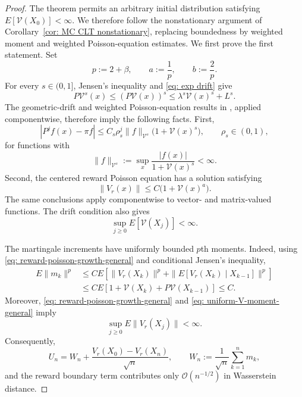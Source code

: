 \documentclass[11pt]{article}
\newcommand{\ve}{\mathscr{V}}
\begin{document}
\begin{proof}
The theorem permits an arbitrary initial distribution satisfying
$E[\ve(X_0)]<\infty$. We therefore follow the nonstationary argument of
Corollary~\ref{cor: MC CLT nonstationary}, replacing boundedness by weighted
moment and weighted Poisson-equation estimates. We first prove the first
statement. Set
\[
    p:=2+\beta,
    \qquad
    a:=\frac1p,
    \qquad
    b:=\frac2p.
\]
For every $s\in(0,1]$, Jensen's inequality and
\eqref{eq: exp drift} give
\[
    P\ve^s(x)
    \leq
    (P\ve(x))^s
    \leq
    \lambda^s\ve(x)^s+L^s.
\]
The geometric-drift and weighted Poisson-equation results in
\cite[Chapters~16--17]{meyn2012markov}, applied componentwise, therefore
imply the following facts. First,
\begin{equation}\label{eq: weighted-geometric-general}
    |P^j f(x)-\pi f|
    \leq
    C_s\rho_s^j\|f\|_{\ve^s}
    \bigl(1+\ve(x)^s\bigr),
    \qquad
    \rho_s\in(0,1),
\end{equation}
for functions with
\[
    \|f\|_{\ve^s}
    :=
    \sup_x\frac{|f(x)|}{1+\ve(x)^s}<\infty.
\]
Second, the centered reward Poisson equation has a solution satisfying
\begin{equation}\label{eq: reward-poisson-growth-general}
    \|V_r(x)\|
    \leq
    C\bigl(1+\ve(x)^a\bigr).
\end{equation}
The same conclusions apply componentwise to vector- and matrix-valued
functions. The drift condition also gives
\begin{equation}\label{eq: uniform-V-moment-general}
    \sup_{j\geq0}E[\ve(X_j)]<\infty.
\end{equation}

The martingale increments have uniformly bounded $p$th moments. Indeed,
using \eqref{eq: reward-poisson-growth-general} and conditional Jensen's
inequality,
\begin{align*}
E\|m_k\|^p
&\leq
C E\left[
    \|V_r(X_k)\|^p
    +
    \|E[V_r(X_k)\mid X_{k-1}]\|^p
\right]\\
&\leq
C E\left[1+\ve(X_k)+P\ve(X_{k-1})\right]
\leq C.
\end{align*}
Moreover, \eqref{eq: reward-poisson-growth-general} and
\eqref{eq: uniform-V-moment-general} imply
\[
    \sup_{j\geq0}E\|V_r(X_j)\|<\infty.
\]
Consequently,
\[
    U_n
    =
    W_n+
    \frac{V_r(X_0)-V_r(X_n)}{\sqrt n},
    \qquad
    W_n:=\frac1{\sqrt n}\sum_{k=1}^n m_k,
\]
and the reward boundary term contributes only $\mathcal O(n^{-1/2})$ in
Wasserstein distance.


\end{proof}
\end{document}
